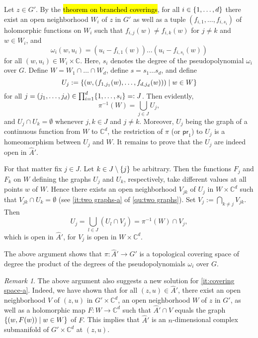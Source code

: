 \documentclass[a4paper]{amsart}
\newcommand{\C}{\mathbb{C}}
\newcommand{\pr}[1]{\mathsf{pr}_{#1}}
\theoremstyle{remark}
\newtheorem{remark}{Remark}[question]
\numberwithin{equation}{question}
\DeclarePairedDelimiter\set{\{}{\}}
\begin{document}
\begin{solution}
\begin{solenum}
\item Let $z \in G'$. By the \hl{theorem on branched coverings}, for all $i \in \set{1,\dots,d}$ there exist an open neighborhood $W_i$ of $z$ in $G'$ as well as a tuple $(f_{i,1},\dots,f_{i,s_i})$ of holomorphic functions on $W_i$ such that $f_{i,j}(w) \ne f_{i,k}(w)$ for $j \ne k$ and $w \in W_i$, and
\[
\omega_i(w,u_i) = (u_i - f_{i,1}(w)) \dots (u_i - f_{i,s_i}(w))
\]
for all $(w,u_i) \in W_i \times \C$. Here, $s_i$ denotes the degree of the pseudopolynomial $\omega_i$ over $G$. Define $W = W_1 \cap \dots \cap W_d$, define $s = s_1 \dots s_d$, and define
\[
U_j := \set{(w,(f_{1,j_1}(w),\dots,f_{d,j_d}(w))) \mid w \in W}
\]
for all $j = (j_1,\dots,j_d) \in \prod_{i=1}^d \set{1,\dots,s_i} =: J$. Then evidently,
\[
\pi^{-1}(W) = \bigcup_{j \in J} U_j,
\]
and $U_j \cap U_k = \emptyset$ whenever $j,k \in J$ and $j \ne k$. Moreover, $U_j$ being the graph of a continuous function from $W$ to $\C^d$, the restriction of $\pi$ (or $\pr1$) to $U_j$ is a homeomorphism between $U_j$ and $W$. It remains to prove that the $U_j$ are indeed open in $\hat A'$.

For that matter fix $j \in J$. Let $k \in J \setminus \set j$ be arbitrary. Then the functions $F_j$ and $F_k$ on $W$ defining the graphs $U_j$ and $U_k$, respectively, take different values at all points $w$ of $W$. Hence there exists an open neighborhood $V_{jk}$ of $U_j$ in $W \times \C^d$ such that $V_{jk} \cap U_k = \emptyset$ (see \cref{it:two graphs-a} of \cref{qu:two graphs}). Set $V_j := \bigcap_{k \ne j} V_{jk}$. Then
\[
U_j = \bigcup_{l \in J} (U_l \cap V_j) = \pi^{-1}(W) \cap V_j,
\]
which is open in $\hat A'$, for $V_j$ is open in $W \times \C^d$.

The above argument shows that $\pi \colon \hat A' \to G'$ is a topological covering space of degree the product of the degrees of the pseudopolynomials $\omega_i$ over $G$.

\begin{remark}
The above argument also suggests a new solution for \cref{it:covering space-a}. Indeed, we have shown that for all $(z,u) \in \hat A'$, there exist an open neighborhood $V$ of $(z,u)$ in $G' \times \C^d$, an open neighborhood $W$ of $z$ in $G'$, as well as a holomorphic map $F \colon W \to \C^d$ such that $\hat A' \cap V$ equals the graph $\set{(w,F(w)) \mid w \in W}$ of $F$. This implies that $\hat A'$ is an $n$-dimensional complex submanifold of $G' \times \C^d$ at $(z,u)$.
\end{remark}


\end{solenum}
\end{solution}
\end{document}
